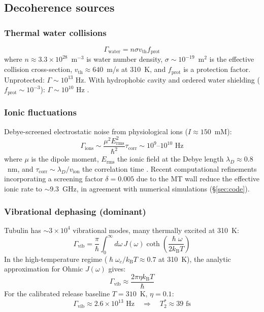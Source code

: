 \documentclass[twocolumn,10pt]{article}
\renewcommand{\hbar}{\hslash}
\newcommand{\kB}{k_{\text{B}}}
\newcommand{\fs}{\text{~fs}}
\newcommand{\Hz}{\text{~Hz}}
\begin{document}
\subsection{Decoherence sources}
\subsubsection{Thermal water collisions}
\begin{equation}
\Gamma_{\text{water}} = n \sigma v_{\text{th}} f_{\text{prot}}
\end{equation}
where $n \approx 3.3 \times 10^{28}$~m$^{-3}$ is water number density,
$\sigma \sim 10^{-19}$~m$^2$ is the effective collision cross-section,
$v_{\text{th}} \approx 640$~m/s at 310~K, and $f_{\text{prot}}$ is a
protection factor. Unprotected: $\Gamma \sim 10^{13}\Hz$. With hydrophobic
cavity and ordered water shielding ($f_{\text{prot}} \sim 10^{-3}$):
$\Gamma \sim 10^{10}\Hz$ \cite{Eaves2005}.

\subsubsection{Ionic fluctuations}
Debye-screened electrostatic noise from physiological ions
($I \approx 150$~mM):
\begin{equation}
\Gamma_{\text{ions}} \sim \frac{\mu^2 E_{\text{rms}}^2}{\hbar^2}
\tau_{\text{corr}} \sim 10^{9}\text{--}10^{10}\Hz
\end{equation}
where $\mu$ is the dipole moment, $E_{\text{rms}}$ the ionic field at the
Debye length $\lambda_D \approx 0.8$~nm, and
$\tau_{\text{corr}} \sim \lambda_D / v_{\text{ion}}$ the correlation time
\cite{Hagan2002,Xiang2019,Israelachvili2011}. Recent computational
refinements incorporating a screening factor $\delta = 0.005$ due to the
MT wall reduce the effective ionic rate to $\sim 9.3$~GHz, in agreement
with numerical simulations (\S\ref{sec:code}).

\subsubsection{Vibrational dephasing (dominant)}
Tubulin has $\sim 3 \times 10^4$ vibrational modes, many thermally excited
at 310~K:
\begin{equation}
\Gamma_{\text{vib}} = \frac{\pi}{\hbar} \int_0^\infty d\omega \, J(\omega)
\coth\!\left(\frac{\hbar\omega}{2\kB T}\right)
\label{eq:Gamma_vib_full}
\end{equation}
In the high-temperature regime ($\hbar\omega_c / \kB T \approx 0.7$ at
310~K), the analytic approximation for Ohmic $J(\omega)$ gives:
\begin{equation}
\Gamma_{\text{vib}} \approx \frac{2\pi \eta \kB T}{\hbar}
\end{equation}
For the calibrated release baseline $T = 310$~K, $\eta = 0.1$:
\begin{equation}
\boxed{\Gamma_{\text{vib}} \approx 2.6\times 10^{13}\Hz
\quad \Rightarrow \quad T_2^* \approx 39\fs}
\label{eq:tau_vib_boxed}
\end{equation}
\end{document}
